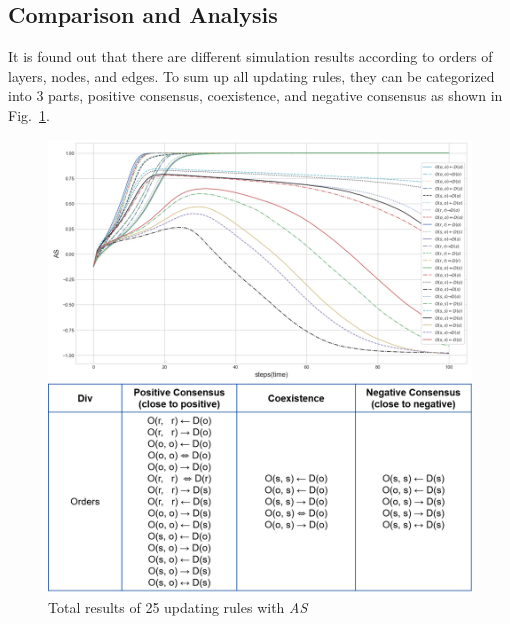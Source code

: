\subsection{Comparison and Analysis}
It is found out that there are different simulation results according to orders of layers, nodes, and edges. To sum up all updating rules, they can be categorized into 3 parts, positive consensus, coexistence, and negative consensus as shown in Fig.~\ref{ordertotal}.  
\begin{figure}[!htb]
	\centering
	\includegraphics[width=\hsize]{figure/ordertotal.png}
	\caption{Total results of 25 updating rules with \textit{AS}}
	\label{ordertotal}
\end{figure}


